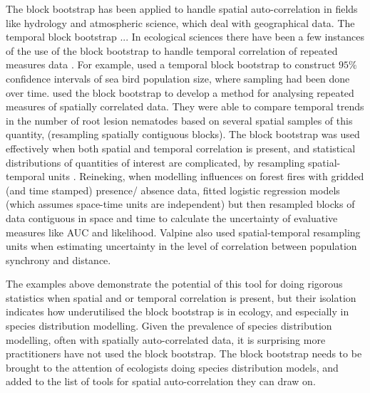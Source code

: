 \documentclass[a4paper,12pt]{article}
\begin{document}
The block bootstrap has been applied to handle spatial auto-correlation in fields like hydrology and atmospheric science, which deal with geographical data.
The temporal block bootstrap ...
In ecological sciences there have been a few instances of the use of the block bootstrap to handle temporal correlation of repeated measures data \citep[such as][]{clarke2003validating, nelson2012long,hinrichsen2013role}. For example, \cite{clarke2003validating} used a temporal block bootstrap to construct $95\%$ confidence intervals of sea bird population size, where sampling had been done over time. 
\cite{zhu2004nonparametric} used the block bootstrap to develop a method for analysing repeated measures of spatially correlated data. They were able to compare temporal trends in the number of root lesion nematodes based on several spatial samples of this quantity, (resampling spatially contiguous blocks). The block bootstrap was used effectively when both spatial and temporal correlation is present, and statistical distributions of quantities of interest are complicated, by resampling spatial-temporal units \citep[e.g.][]{valpine2010synchrony,reineking2010environmental}. Reineking, when modelling influences on forest fires with gridded (and time stamped) presence/ absence data, fitted logistic regression models (which assumes space-time units are independent) but then resampled blocks of data contiguous in space and time to calculate the uncertainty of evaluative measures like AUC and likelihood. Valpine also used spatial-temporal resampling units when estimating uncertainty in the level of correlation between population synchrony and distance. 


The examples above demonstrate the potential of this tool for doing rigorous statistics when spatial and or temporal correlation is present, but their isolation indicates how underutilised the block bootstrap is in ecology, and especially in species distribution modelling. Given the prevalence of species distribution modelling, often with spatially auto-correlated data, it is surprising more practitioners have not used the block bootstrap. The block bootstrap needs to be brought to the attention of ecologists doing species distribution models, and added to the list of tools for spatial auto-correlation they can draw on. 
\end{document}
